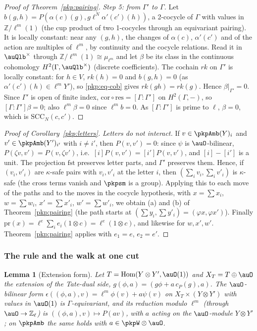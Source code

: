 \documentclass[10pt]{amsart}
\newtheorem{lemma}[theorem]{Lemma}
\theoremstyle{definition}
\theoremstyle{remark}
\newcommand{\Z}{\mathbb Z}
\begin{document}
\begin{proof}[Proof of Theorem~\ref{pkp:pairing}]
\emph{Step 5: from $\Gamma'$ to $\Gamma$.} Let $b(g,h)=P(\alpha(c)(g),g\ell^N\alpha'(c')(h))$, a
2-cocycle of $\Gamma$ with values in $\Z/\ell^m(1)$ (the cup product of two 1-cocycles through an
equivariant pairing). It is locally constant: near any $(g,h)$, the changes of $\alpha(c)$,
$\alpha'(c')$ and of the action are multiples of $\ell^m$, by continuity and the cocycle relations.
Read it in $\auQlb^\times$ through $\Z/\ell^m(1)\cong\mu_{\ell^m}$ and let $\beta$ be its class in the
continuous cohomology $H^2(\Gamma,\auQlb^\times)$ (discrete coefficients). The cochain $rk$ on
$\Gamma'$ is locally constant: for $h\in V$, $rk(h)=0$ and $b(g,h)=0$ (as $\alpha'(c')(h)\in\ell^mY'$),
so \eqref{pkp:eq-cob} gives $rk(gh)=rk(g)$. Hence $\beta|_{\Gamma'}=0$. Since $\Gamma'$ is open of
finite index, $\mathrm{cor}\circ\mathrm{res}=[\Gamma:\Gamma']$ on $H^2(\Gamma,-)$, so
$[\Gamma:\Gamma']\beta=0$; also $\ell^m\beta=0$ since $\ell^m b=0$. As $[\Gamma:\Gamma']$ is prime to
$\ell$, $\beta=0$, which is $\mathrm{SCC}_N(c,c')$.
\end{proof}

\begin{proof}[Proof of Corollary~\ref{pkp:letters}]
\emph{Letters do not interact.} If $v\in\pkpAmb(Y)_i$ and $v'\in\pkpAmb(Y')_{i'}$ with $i\ne i'$,
then $P(v,v')=0$: since $\psi$ is $\auO$-bilinear, $P(\zeta v,v')=P(v,\zeta v')$, i.e.\
$[i]P(v,v')=[i']P(v,v')$, and $[i]-[i']$ is a unit. The projection $\mathrm{fst}$ preserves letter
parts, and $\Gamma'$ preserves them. Hence, if $(v_i,v'_i)$ are $\kappa$-safe pairs with $v_i,v'_i$
at the letter $i$, then $(\sum_iv_i,\sum_iv'_i)$ is $\kappa$-safe (the cross terms vanish and
$\pkpsm$ is a group). Applying this to each move of the paths and to the moves in the cocycle
hypothesis, with $x=\sum x_i$, $w=\sum w_i$, $x'=\sum x'_i$, $w'=\sum w'_i$, we obtain (a) and
(b) of Theorem~\ref{pkp:pairing} (the path starts at $(\sum y_i,\sum y'_i)=(\varphi x,\varphi
x')$). Finally $\mathrm{pr}(x)=\ell^e\sum_ie_i(1\otimes c)=\ell^e(1\otimes c)$, and likewise for
$w,x',w'$. Theorem~\ref{pkp:pairing} applies with $e_1=e$, $e_2=e'$.
\end{proof}

\subsubsection{The rule and the walk at one cut}\label{pkp:ss-walk}

\begin{lemma}[Extension form]\label{pkp:extform}
Let $T=\operatorname{Hom}(Y\otimes Y',\auO(1))$ and $X_T=T\oplus\auO$ the extension of the Tate-dual
side, $g(\phi,a)=(g\phi+a\,c_P(g),a)$. The $\auO$-bilinear form $\epsilon((\phi,a),v)=\ell^m\phi(v)+a
\psi(v)$ on $X_T\times(Y\otimes Y')$ with values in $\auO(1)$ is $\Gamma$-equivariant, and its
reduction modulo $\ell^m$ (through $\auO\to\Z_\ell$) is $((\phi,a),v)\mapsto P(av)$, with $a$ acting on the $\auO$-module $Y\otimes Y'$; on
$\pkpAmb$ the same holds with $a\in\pkpW\otimes\auO$.
\end{lemma}
\end{document}
